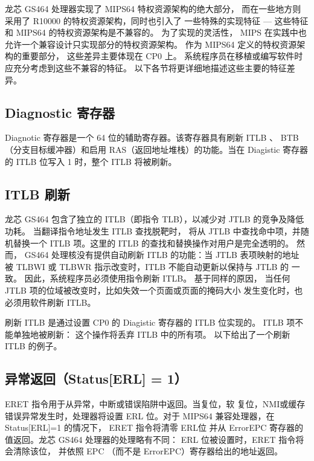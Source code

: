 龙芯 GS464 处理器实现了 MIPS64 特权资源架构的绝大部分， 而在一些地方则采用了
R10000 的特权资源架构，同时也引入了 一些特殊的实现特征 --- 这些特征和 MIPS64
的特权资源架构是不兼容的。 为了实现的灵活性， MIPS 在实践中也
允许一个兼容设计只实现部分的特权资源架构。 作为 MIPS64
定义的特权资源架构的重要部分， 这些差异主要体现在 CP0 上。
系统程序员在移植或编写软件时应充分考虑到这些不兼容的特征。
以下各节将更详细地描述这些主要的特征差异。

\subsection{Diagnostic 寄存器}

Diagnotic 寄存器是一个 64 位的辅助寄存器。该寄存器具有刷新 ITLB 、
BTB （分支目标缓冲器）和启用 RAS（返回地址堆栈）的功能。当在 Diagistic 寄存器
的 ITLB 位写入 1 时，整个 ITLB 将被刷新。


\subsection{ITLB 刷新}\label{subsec:itlb-flushing}

龙芯 GS464 包含了独立的 ITLB（即指令 TLB），以减少对
JTLB 的竞争及降低功耗。 当翻译指令地址发生 ITLB 查找脱靶时，
将从 JTLB 中查找命中项，并随机替换一个 ITLB 项。这里的 ITLB
的查找和替换操作对用户是完全透明的。
然而， GS464 处理核没有提供自动刷新 ITLB 的功能：当 JTLB 表项映射的地址
被 TLBWI 或 TLBWR 指示改变时，ITLB 不能自动更新以保持与 JTLB 的
一致。 因此，系统程序员必须使用指令刷新 ITLB。 基于同样的原因，
当任何 JTLB 项的位域被改变时，比如失效一个页面或页面的掩码大小
发生变化时，也必须用软件刷新 ITLB。

刷新 ITLB 是通过设置 CP0 的 Diagistic 寄存器的 ITLB 位实现的。
ITLB 项不能单独地被刷新： 这个操作将丢弃 ITLB 中的所有项。
以下给出了一个刷新 ITLB 的例子。



\subsection{异常返回（Status[ERL] = 1）}

ERET 指令用于从异常，中断或错误陷阱中返回。当复位，软
复位，NMI或缓存错误异常发生时，处理器将设置 ERL 位。对于
MIPS64 兼容处理器，在 Status[ERL]=1 的情况下， ERET 指令将清零
ERL位 并从 ErrorEPC 寄存器的值返回。龙芯 GS464 处理器的处理略有不同：
ERL 位被设置时，ERET 指令将会清除该位， 并依照 EPC
（而不是 ErrorEPC）寄存器给出的地址返回。

